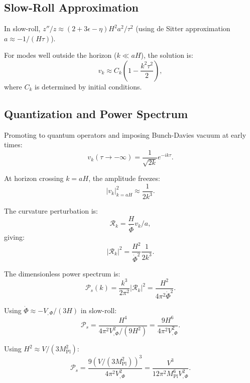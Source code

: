 \documentclass[11pt,a4paper]{article}
\numberwithin{equation}{section}
\theoremstyle{plain}
\theoremstyle{definition}
\theoremstyle{remark}
\begin{document}
\subsection{Slow-Roll Approximation}

In slow-roll, $z''/z \approx (2 + 3\epsilon - \eta)H^2a^2/\tau^2$ (using de Sitter approximation $a \approx -1/(H\tau)$).

For modes well outside the horizon ($k \ll aH$), the solution is:
\begin{equation}
v_k \approx C_k\left(1 - \frac{k^2\tau^2}{2}\right),
\end{equation}
where $C_k$ is determined by initial conditions.

\subsection{Quantization and Power Spectrum}

Promoting to quantum operators and imposing Bunch-Davies vacuum at early times:
\begin{equation}
v_k(\tau\to -\infty) = \frac{1}{\sqrt{2k}}e^{-ik\tau}.
\end{equation}

At horizon crossing $k = aH$, the amplitude freezes:
\begin{equation}
|v_k|^2_{k=aH} \approx \frac{1}{2k^3}.
\end{equation}

The curvature perturbation is:
\begin{equation}
\mathcal{R}_k = \frac{H}{\dot{\Phi}}v_k/a,
\end{equation}
giving:
\begin{equation}
|\mathcal{R}_k|^2 = \frac{H^2}{\dot{\Phi}^2}\frac{1}{2k^3}.
\end{equation}

The dimensionless power spectrum is:
\begin{equation}
\mathcal{P}_s(k) = \frac{k^3}{2\pi^2}|\mathcal{R}_k|^2 = \frac{H^2}{4\pi^2\dot{\Phi}^2}.
\end{equation}

Using $\dot{\Phi} \approx -V_{,\Phi}/(3H)$ in slow-roll:
\begin{equation}
\mathcal{P}_s = \frac{H^4}{4\pi^2 V_{,\Phi}^2/(9H^2)} = \frac{9H^6}{4\pi^2 V_{,\Phi}^2}.
\end{equation}

Using $H^2 \approx V/(3M_{\mathrm{Pl}}^2)$:
\begin{equation}
\mathcal{P}_s = \frac{9(V/(3M_{\mathrm{Pl}}^2))^3}{4\pi^2 V_{,\Phi}^2} = \frac{V^3}{12\pi^2 M_{\mathrm{Pl}}^6 V_{,\Phi}^2}.
\end{equation}
\end{document}
